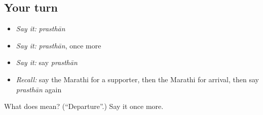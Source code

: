 \subsection*{Your turn}
\begin{itemize}
\raggedright
  \item \emph{Say it:} \emph{prasthān}
  \item \emph{Say it:} \emph{prasthān}, once more
  \item \emph{Say it:} say \emph{prasthān}
  \item \emph{Recall:} say the Marathi for a supporter, then the Marathi for arrival, then say \emph{prasthān} again
\end{itemize}

\begin{tcolorbox}[breakable,colback=teal!4,colframe=teal!35!black,title={Before you move on}]
What does  mean? (\textquotedblleft{}Departure\textquotedblright{}.) Say it once more.
\end{tcolorbox}

